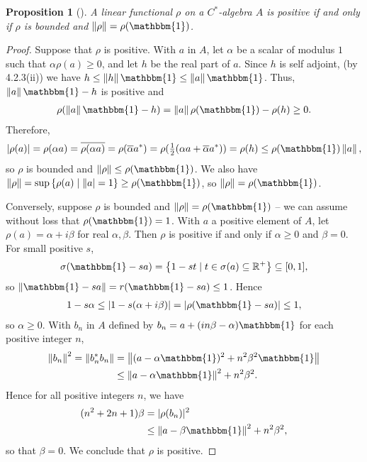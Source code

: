 \documentclass[11pt,a4paper]{report}
\theoremstyle{plain}
\newtheorem{prop}{Proposition}
\theoremstyle{definition}
\newcommand{\1}{\mathbbm{1}}
\newcommand{\R}{\mathbb{R}}
\newcommand{\spec}[1]{\sigma(#1)}
\begin{document}
\begin{prop}[{\cite[4.3.2]{kadison83}}]\label{prop:432}
	A linear functional $\rho$ on a $C^\ast$-algebra $A$ is positive if and only if $\rho$ is bounded
	and $\left\|\rho\right\| = \rho(\1)$.
\end{prop}
\begin{proof}
	Suppose that $\rho$ is positive. With $a$ in $A$, let $\alpha$ be a scalar of modulus $1$ 
	such that $\alpha\rho(a)\geq 0$, and let $h$ be the real part of $a$.
	Since $h$ is self adjoint, (by 4.2.3(ii)) we have $h \leq \left\|h\right\|\1 \leq \left\|a\right\|\1$. Thus, $\left\|a\right\|\1-h$
	is positive and 
	\begin{align*}
		\rho(\left\|a\right\|\1-h) = \left\|a\right\|\rho(\1)-\rho(h) \geq 0.
	\end{align*}
	Therefore,
	\begin{align*}
		|\rho(a)| = \rho(\alpha a) = \overline{\rho(\alpha a)} = \rho(\overline{\alpha}a^\ast) = 
					\rho(\tfrac{1}{2}(\alpha a +\overline{\alpha}a^\ast)) =
					\rho(h) \leq \rho(\1) \left\|a\right\|,
	\end{align*}
	so $\rho$ is bounded and $\left\|\rho\right\| \leq \rho(\1)$. We also have $\left\|\rho\right\| = 
	\sup\left\{\rho(a) \mid \left\|a\right| = 1\right\} \geq \rho(\1)$, so $\left\|\rho\right\|=\rho(\1)$.
	
	Conversely, suppose $\rho$ is bounded and $\left\|\rho\right\| = \rho(\1)$ -- we can assume without loss that 
	$\rho(\1)=1$. With $a$ a positive element of $A$, let $\rho(a)=\alpha+i\beta$ for real $\alpha
	,\beta$. Then $\rho$ is positive if and only if $\alpha \geq 0$ and $\beta = 0$.
	For small positive $s$, 
	\begin{align*}
		\spec{\1-sa} = \left\{1-st \mid t\in \spec{a} \subseteq \R^+\right\} \subseteq [0,1],
	\end{align*}
	so $\left\|\1-sa\right\| = r(\1-sa) \leq 1$. Hence
	\begin{align*}
		1-s\alpha \leq |1-s(\alpha+i\beta)| = |\rho(\1 - sa)| \leq 1,
	\end{align*}
	so $\alpha\geq0$. With $b_n$ in $A$ defined by $b_n= a+(in\beta-\alpha)\1$ for each positive
	integer $n$,
	\begin{align*}
				\left\|b_n\right\|^2 = \left\|b_n^\ast b_n\right\| 
		&= 		\left\|(a-\alpha\1)^2 + n^2\beta^2\1\right\| 									\\
		&\leq 	\left\|a-\alpha\1\right\|^2 +n^2\beta^2.
	\end{align*}
	Hence for all positive integers $n$, we have
	\begin{align*}
				(n^2+2n+1)\beta 
		&=	 	|\rho(b_n)|^2  														\\
		&\leq 	\left\|a-\beta\1\right\|^2 +n^2\beta^2,
	\end{align*}
	so that $\beta=0$. We conclude that $\rho$ is positive.
\end{proof}
\end{document}
